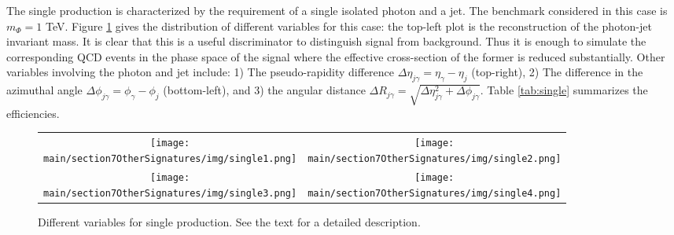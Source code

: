 The single production is characterized by the requirement of a single isolated photon and a jet. The benchmark considered in this case is $m_\Phi=1$ TeV. 
Figure \ref{fig:single} gives the distribution of different variables for this case: the top-left plot is the reconstruction of the photon-jet invariant mass. It is clear 
that this is a useful discriminator to distinguish signal from background. Thus it is enough to simulate the corresponding QCD events in the phase space 
of the signal where the effective cross-section of the former is reduced substantially. Other variables involving the photon and jet include: 1) The 
pseudo-rapidity difference $\Delta \eta_{j\gamma}=\eta_\gamma-\eta_j$ (top-right), 2) The difference in the azimuthal angle 
$\Delta \phi_{j\gamma}=\phi_\gamma-\phi_j$ (bottom-left), and 3) the angular distance $\Delta R_{j\gamma} =\sqrt{\Delta\eta_{j\gamma}^2+\Delta \phi_{j\gamma}} $.
Table \ref{tab:single} summarizes the efficiencies.
	\begin{figure}[htb!]
		\begin{center}
			\begin{tabular}{cc}
				\texttt{[image: \\main/section7OtherSignatures/img/single1.png]}&\texttt{[image: \\main/section7OtherSignatures/img/single2.png]}\\
				\texttt{[image: \\main/section7OtherSignatures/img/single3.png]}&\texttt{[image: \\main/section7OtherSignatures/img/single4.png]}
			\end{tabular}
		\end{center}
		\caption{ Different variables for single production. See the text for a detailed description.}
		\protect\label{fig:single}
	\end{figure}
    
